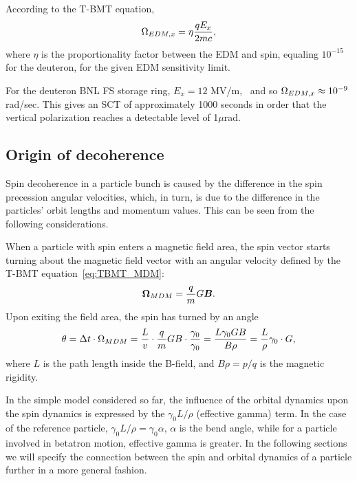 \documentclass{article}
\begin{document}
According to the T-BMT equation,
\[
\Omega_{EDM,x} = \eta\frac{qE_x}{2mc},
\]
where $\eta$ is the proportionality factor between the EDM and spin, equaling $10^{-15}$ for the deuteron, for the given EDM sensitivity limit.~\citep[p.~206]{Eremey:Thesis}

For the deuteron BNL FS storage ring, $E_x = 12$ MV/m,~\citep[p.~19]{BNL:Deuteron2008} and so $\Omega_{EDM,x}\approx 10^{-9}$ rad/sec. This gives an SCT of approximately 1000 seconds in order that the vertical polarization reaches a detectable level of 1$\mu$rad.~\citep[p.~207]{Eremey:Thesis}

\subsection{Origin of decoherence}\label{sec:Decoh_origin}
Spin decoherence in a particle bunch is caused by the difference in the spin precession angular velocities, which, in turn, is due to the difference in the particles' orbit lengths and momentum values. This can be seen from the following considerations.

When a particle with spin enters a magnetic field area, the spin vector starts turning about the magnetic field vector with an angular velocity defined by the T-BMT equation~\eqref{eq:TBMT_MDM}:
\begin{equation*}
  \boldsymbol{\Omega}_{MDM} = \frac qm G\boldsymbol B.
\end{equation*}
Upon exiting the field area, the spin has turned by an angle
\begin{equation*}
  \theta = \Delta t\cdot\Omega_{MDM} = \frac Lv \cdot \frac qm GB\cdot \frac{\gamma_0}{\gamma_0} = \frac{L\gamma_0 GB}{B\rho} = \frac L\rho\gamma_0\cdot G,
\end{equation*}
where $L$ is the path length inside the B-field, and $B\rho = p/q$ is the magnetic rigidity.

In the simple model considered so far, the influence of the orbital dynamics upon the spin dynamics is expressed by the $\gamma_0 L/\rho$ (effective gamma) term. In the case of the reference particle, $\gamma_0L/\rho = \gamma_0\alpha$, $\alpha$ is the bend angle, while for a particle involved in betatron motion, effective gamma is greater. In the following sections we will specify the connection between the spin and orbital dynamics of a particle further in a more general fashion.
\end{document}
